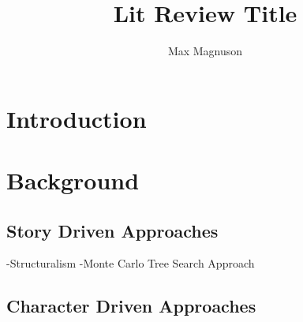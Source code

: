 \documentclass[]{article}
\title{Lit Review Title}
\author{Max Magnuson}
\begin{document}
\maketitle

\begin{abstract}
	
\end{abstract}

\section{Introduction}
\cite{ThematicEmerge}

\section{Background}

\subsection{Story Driven Approaches}
-Structuralism
-Monte Carlo Tree Search Approach

\subsection{Character Driven Approaches}



\end{document}
